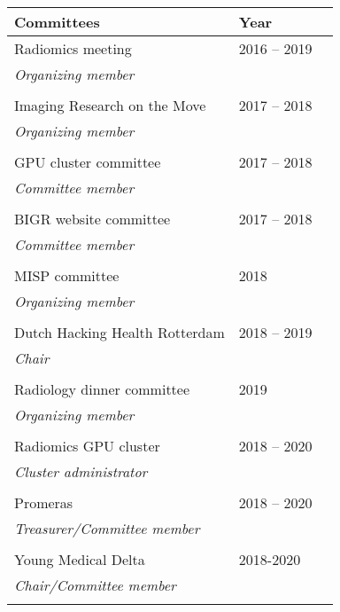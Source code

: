 \vspace*{2cm}
\begin{tabular}{L{8cm}lr}
    \textbf{Committees}&\textbf{Year}\\
    \toprule
    Radiomics meeting& 2016 -- 2019\\
    \textit{Organizing member}\\
    \\
    Imaging Research on the Move& 2017 -- 2018\\
    \textit{Organizing member}\\
    \\
    GPU cluster committee & 2017 -- 2018\\
    \textit{Committee member}\\
    \\
    BIGR website committee & 2017 -- 2018\\
    \textit{Committee member}\\
    \\
    MISP committee & 2018\\
    \textit{Organizing member}\\
    \\
    Dutch Hacking Health Rotterdam & 2018 -- 2019\\
    \textit{Chair}\\
    \\
    Radiology dinner committee & 2019\\
    \textit{Organizing member}\\
    \\
    Radiomics GPU cluster & 2018 -- 2020\\
    \textit{Cluster administrator}\\
    \\
    Promeras & 2018 -- 2020\\
    \textit{Treasurer/Committee member}\\
    \\
    Young Medical Delta & 2018-2020\\
    \textit{Chair/Committee member}\\
    \\
\end{tabular}
